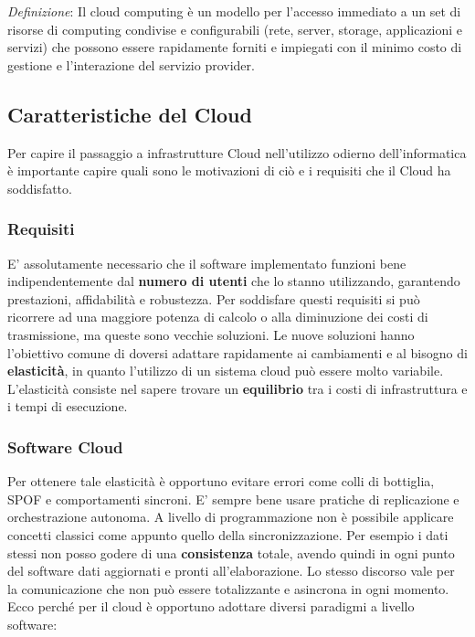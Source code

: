 \documentclass{article}
\begin{document}
		\emph{Definizione}: Il cloud computing è un modello per l'accesso immediato a un set di risorse di computing condivise e configurabili (rete, server, storage, applicazioni e servizi) che possono essere rapidamente forniti e impiegati con il minimo costo di gestione e l'interazione del servizio provider. 
		
		\subsection{Caratteristiche del Cloud}
		Per capire il passaggio a infrastrutture Cloud nell'utilizzo odierno dell'informatica è importante capire quali sono le motivazioni di ciò e i requisiti che il Cloud ha soddisfatto.
		
		\subsubsection{Requisiti}
		E' assolutamente necessario che il software implementato funzioni bene indipendentemente dal \textbf{numero di utenti} che lo stanno utilizzando, garantendo prestazioni, affidabilità e robustezza. 
		Per soddisfare questi requisiti si può ricorrere ad una maggiore potenza di calcolo o alla diminuzione dei costi di trasmissione, ma queste sono vecchie soluzioni. Le nuove soluzioni hanno l'obiettivo comune di doversi adattare rapidamente ai cambiamenti e al bisogno di \textbf{elasticità}, in quanto l'utilizzo di un sistema cloud può essere molto variabile.
		L'elasticità consiste nel sapere trovare un \textbf{equilibrio} tra i costi di infrastruttura e i tempi di esecuzione.
		
		\subsubsection{Software Cloud}
		Per ottenere tale elasticità è opportuno evitare errori come colli di bottiglia, SPOF e comportamenti sincroni. 
		E' sempre bene usare pratiche di replicazione e orchestrazione autonoma.
		A livello di programmazione non è possibile applicare concetti classici come appunto quello della sincronizzazione.
		Per esempio i dati stessi non posso godere di una \textbf{consistenza} totale, avendo quindi in ogni punto del software dati aggiornati e pronti all'elaborazione.
		Lo stesso discorso vale per la comunicazione che non può essere totalizzante e asincrona in ogni momento. 
		Ecco perché per il cloud è opportuno adottare diversi paradigmi a livello software:
		
\end{document}
